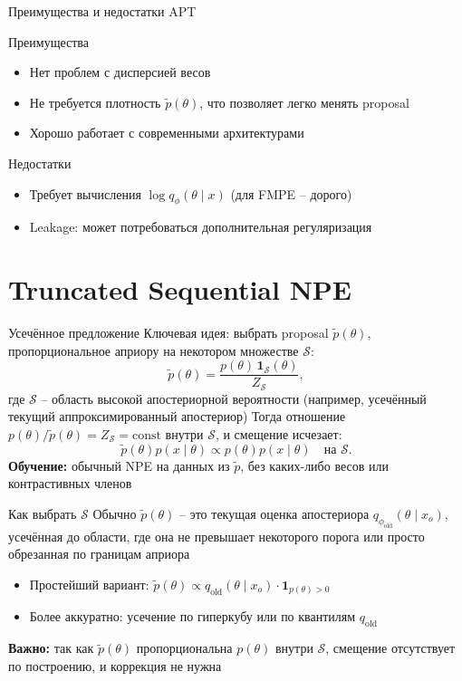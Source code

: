 \documentclass[10pt,aspectratio=169]{beamer}
\begin{document}
\begin{frame}{Преимущества и недостатки APT}
    \begin{block}{Преимущества}
        \begin{itemize}
            \item Нет проблем с дисперсией весов
            \item Не требуется плотность $\tilde{p}(\theta)$, что позволяет легко менять proposal
            \item Хорошо работает с современными архитектурами
        \end{itemize}
    \end{block}
    \pause
    \begin{block}{Недостатки}
        \begin{itemize}
            \item Требует вычисления $\log q_\phi(\theta\mid x)$ (для FMPE – дорого)
            \item Leakage: может потребоваться дополнительная регуляризация
        \end{itemize}
    \end{block}
\end{frame}

\section{Truncated Sequential NPE}

\begin{frame}{Усечённое предложение}
    Ключевая идея: выбрать proposal $\tilde{p}(\theta)$, пропорциональное априору на некотором множестве $\mathcal{S}$:
    \[
    \tilde{p}(\theta) = \frac{p(\theta)\,\mathbf{1}_{\mathcal{S}}(\theta)}{Z_{\mathcal{S}}},
    \]
    где $\mathcal{S}$ – область высокой апостериорной вероятности (например, усечённый текущий аппроксимированный апостериор)
    \pause
    Тогда отношение $p(\theta)/\tilde{p}(\theta) = Z_{\mathcal{S}} = \text{const}$ внутри $\mathcal{S}$, и смещение исчезает:
    \[
    \tilde{p}(\theta)p(x\mid\theta) \propto p(\theta)p(x\mid\theta) \quad \text{на } \mathcal{S}.
    \]
    \pause
    \textbf{Обучение:} обычный NPE на данных из $\tilde{p}$, без каких-либо весов или контрастивных членов
\end{frame}

\begin{frame}{Как выбрать $\mathcal{S}$}
    Обычно $\tilde{p}(\theta)$ – это текущая оценка апостериора $q_{\phi_{\text{old}}}(\theta\mid x_o)$, усечённая до области, где она не превышает некоторого порога или просто обрезанная по границам априора
    \pause
    \begin{itemize}
        \item Простейший вариант: $\tilde{p}(\theta) \propto q_{\text{old}}(\theta\mid x_o) \cdot \mathbf{1}_{p(\theta)>0}$
        \item Более аккуратно: усечение по гиперкубу или по квантилям $q_{\text{old}}$
    \end{itemize}
    \pause
    \textbf{Важно:} так как $\tilde{p}(\theta)$ пропорциональна $p(\theta)$ внутри $\mathcal{S}$, смещение отсутствует по построению, и коррекция не нужна 
\end{frame}
\end{document}
